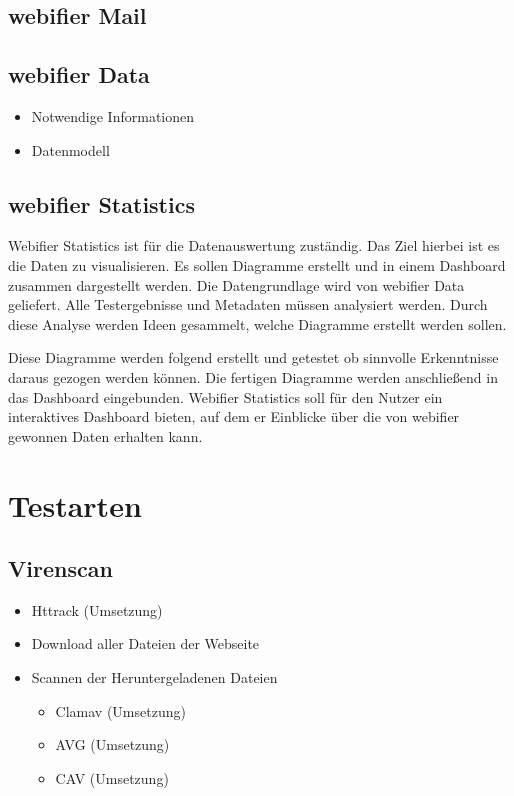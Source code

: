 \subsection{webifier Mail}


\subsection{webifier Data}


\begin{itemize}
  \item Notwendige Informationen
  \item Datenmodell
\end{itemize}

\subsection{webifier Statistics}

Webifier Statistics ist für die Datenauswertung zuständig. Das Ziel hierbei ist es die Daten zu visualisieren. Es sollen Diagramme erstellt und in einem Dashboard zusammen dargestellt werden. Die Datengrundlage wird von webifier Data geliefert. Alle Testergebnisse und Metadaten müssen analysiert werden. Durch diese Analyse werden Ideen gesammelt, welche Diagramme erstellt werden sollen.

Diese Diagramme werden folgend erstellt und getestet ob sinnvolle Erkenntnisse daraus gezogen werden können. Die fertigen Diagramme werden anschließend in das Dashboard eingebunden. Webifier Statistics soll für den Nutzer ein interaktives Dashboard bieten, auf dem er Einblicke über die von webifier gewonnen Daten erhalten kann.

\section{Testarten}

\subsection{Virenscan}


\begin{itemize}
  \item Httrack (Umsetzung)
  \item Download aller Dateien der Webseite
  \item Scannen der Heruntergeladenen Dateien
  \begin{itemize}
    \item Clamav (Umsetzung)
    \item AVG (Umsetzung)
    \item CAV (Umsetzung)
  \end{itemize}
\end{itemize}

